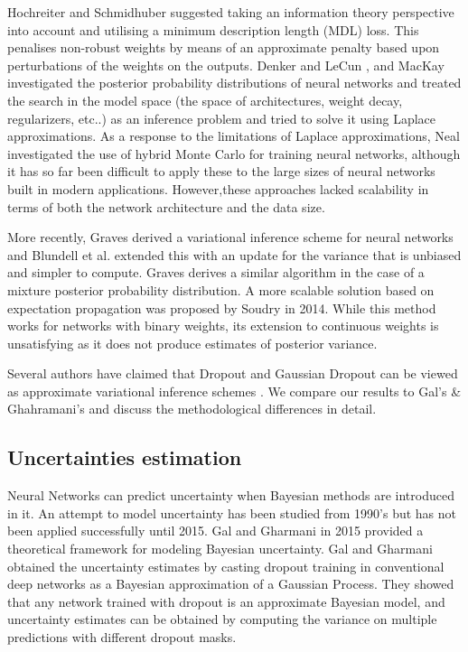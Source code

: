 Hochreiter and Schmidhuber \cite{hochreiter1995simplifying} suggested taking an information theory perspective into account and utilising a minimum description length (MDL) loss. This penalises non-robust weights by means of an approximate penalty based upon perturbations of the weights on the outputs.
Denker and LeCun \cite{denker1991transforming}, and MacKay \cite{mackay1995probable} investigated the posterior probability distributions of neural networks and treated the search in the model space (the space of architectures, weight decay, regularizers, etc..) as an inference problem and tried to solve it using Laplace approximations.
As a response to the limitations of Laplace approximations, Neal \cite{neal2012bayesian} investigated the use of hybrid Monte Carlo for training neural networks, although it has so far been difficult to apply these to the large sizes of neural networks built in modern applications. 
However,these approaches lacked scalability in terms of both the network architecture and the data size. 


More recently, Graves \cite{graves2011practical} derived a variational inference scheme for neural networks and Blundell et al. \cite{blundell2015weight} extended this with an update for the variance that is unbiased and simpler to compute. Graves \cite{graves2016stochastic} derives a similar algorithm in the case of a mixture posterior probability distribution. 
A more scalable solution based on expectation propagation was proposed by Soudry \cite{Soudry:NIPS2014_5269} in 2014. While this method works for networks with binary weights, its extension to continuous weights is unsatisfying as it does not produce estimates of posterior variance.

\newline Several authors have claimed that Dropout \cite{srivastava2014dropout} and Gaussian Dropout \cite{wang2013fast} can be viewed as approximate variational inference schemes \cite{gal2015bayesian, kingma2015variational}. We compare our results to Gal's \& Ghahramani's \cite{gal2015bayesian} and discuss the methodological differences in detail.


\subsection{Uncertainties estimation}

Neural Networks can predict uncertainty when Bayesian methods are introduced in it. An attempt to model uncertainty has been studied from 1990's \cite{neal2012bayesian} but has not been applied successfully until 2015. Gal and Gharmani \cite{Gal2015Dropout} in 2015 provided a theoretical framework for modeling Bayesian uncertainty. Gal and Gharmani \cite{gal2015bayesian} obtained the uncertainty estimates by casting dropout training in conventional deep networks as a Bayesian approximation of a Gaussian Process. They showed that any network trained with dropout is an approximate Bayesian model, and uncertainty estimates can be obtained by computing the variance on multiple predictions with different dropout masks.

